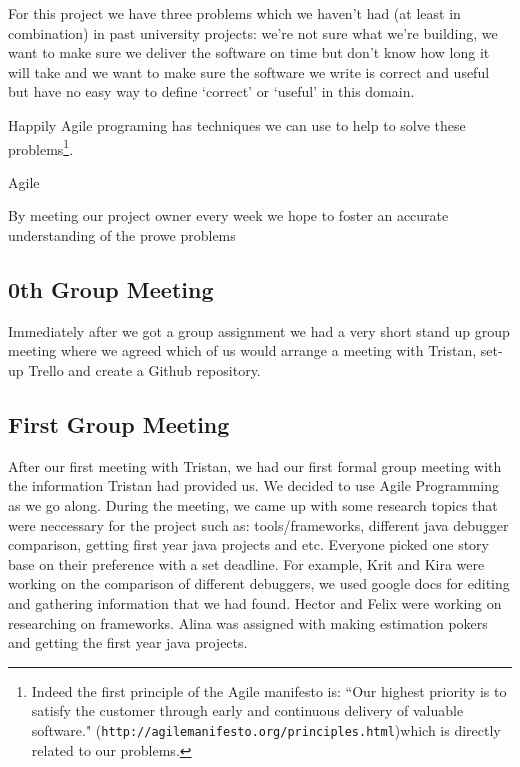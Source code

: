 \documentclass[11pt, a4paper]{article}
\begin{document}
For this project we have three problems which we haven't had (at least in combination) in past university projects: we're not sure what we're building, we want to make sure we deliver the software on time but don't know how long it will take and
we want to make sure the software we write is correct and useful but have no easy way to define `correct' or `useful' in this domain.

Happily Agile programing has techniques we can use to help to solve these problems\footnote{Indeed the first principle of the Agile manifesto is: ``Our highest priority is to satisfy the customer
through early and continuous delivery of valuable software." ({\tt http://agilemanifesto.org/principles.html})which is directly related to our problems.}.

Agile 

By meeting our project owner every week we hope to foster an accurate understanding of the prowe problems

\subsection{0th Group Meeting}
Immediately after we got a group assignment we had a very short stand up group meeting where we agreed which of us would arrange a meeting with Tristan, set-up Trello and create a Github repository.  

\subsection{First Group Meeting}
After our first meeting with Tristan, we had our first formal group meeting with the information Tristan had provided us. We decided to use Agile Programming as we go along. During the meeting, we came up with some research topics that were neccessary for the project such as: tools/frameworks, different java debugger comparison, getting first year java projects and etc. Everyone picked one story base on their preference with a set deadline. For example, Krit and Kira were working on the comparison of different debuggers, we used google docs for editing and gathering information that we had found. Hector and Felix were working on researching on frameworks. Alina was assigned with making estimation pokers and getting the first year java projects. 
\end{document}
